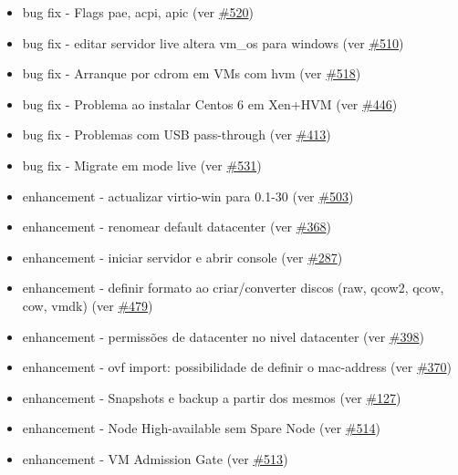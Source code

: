 \begin{itemize}
	\item bug fix - Flags pae, acpi, apic (ver \href{https://srcmaster.eurotux.com/pm/p/etva/ticket/520}{\#520})
	\item bug fix - editar servidor live altera vm\_os para windows (ver \href{https://srcmaster.eurotux.com/pm/p/etva/ticket/510}{\#510})
	\item bug fix - Arranque por cdrom em VMs com hvm (ver \href{https://srcmaster.eurotux.com/pm/p/etva/ticket/518}{\#518})
	\item bug fix - Problema ao instalar Centos 6 em Xen+HVM (ver \href{https://srcmaster.eurotux.com/pm/p/etva/ticket/446}{\#446})
	\item bug fix - Problemas com USB pass-through (ver \href{https://srcmaster.eurotux.com/pm/p/etva/ticket/413}{\#413})
	\item bug fix - Migrate em mode live (ver \href{https://srcmaster.eurotux.com/pm/p/etva/ticket/531}{\#531})
	\item enhancement - actualizar virtio-win para 0.1-30 (ver \href{https://srcmaster.eurotux.com/pm/p/etva/ticket/503}{\#503})
	\item enhancement - renomear default datacenter (ver \href{https://srcmaster.eurotux.com/pm/p/etva/ticket/368}{\#368})
	\item enhancement - iniciar servidor e abrir console (ver \href{https://srcmaster.eurotux.com/pm/p/etva/ticket/287}{\#287})
	\item enhancement - definir formato ao criar/converter discos (raw, qcow2, qcow, cow, vmdk) (ver \href{https://srcmaster.eurotux.com/pm/p/etva/ticket/479}{\#479})
	\item enhancement - permissões de datacenter no nivel datacenter (ver \href{https://srcmaster.eurotux.com/pm/p/etva/ticket/398}{\#398})
	\item enhancement - ovf import: possibilidade de definir o mac-address (ver \href{https://srcmaster.eurotux.com/pm/p/etva/ticket/370}{\#370})
	\item enhancement - Snapshots e backup a partir dos mesmos (ver \href{https://srcmaster.eurotux.com/pm/p/etva/ticket/127}{\#127})
	\item enhancement - Node High-available sem Spare Node (ver \href{https://srcmaster.eurotux.com/pm/p/etva/ticket/514}{\#514})
	\item enhancement - VM Admission Gate (ver \href{https://srcmaster.eurotux.com/pm/p/etva/ticket/513}{\#513})
\end{itemize}

